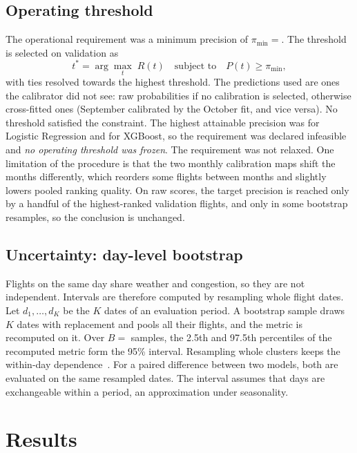 \documentclass[conference]{IEEEtran}
\begin{document}
\subsection{Operating threshold}
The operational requirement was a minimum precision of $\pi_{\min}=$\MinPrecision{}. The threshold
is selected on validation as
\begin{equation}
t^{*}=\arg\max_{t}\; R(t)\quad\text{subject to}\quad P(t)\geq \pi_{\min},
\end{equation}
with ties resolved towards the highest threshold. The predictions used are ones the calibrator did
not see: raw probabilities if no calibration is selected, otherwise cross-fitted ones (September
calibrated by the October fit, and vice versa). No threshold satisfied the constraint. The highest
attainable precision was \MaxPrecLR{} for Logistic Regression and \MaxPrecXGB{} for XGBoost, so
the requirement was declared infeasible and \emph{no operating threshold was frozen}. The
requirement was not relaxed. One limitation of the procedure is that the two monthly calibration
maps shift the months differently, which reorders some flights between months and slightly lowers
pooled ranking quality. On raw scores, the target precision is reached only by a handful of the
highest-ranked validation flights, and only in some bootstrap resamples, so the conclusion is
unchanged.

\subsection{Uncertainty: day-level bootstrap}
Flights on the same day share weather and congestion, so they are not independent. Intervals are
therefore computed by resampling whole flight dates. Let $d_1,\dots,d_K$ be the $K$ dates of an
evaluation period. A bootstrap sample draws $K$ dates with replacement and pools all their flights,
and the metric is recomputed on it. Over $B=$\TestBootResamples{} samples, the 2.5th and 97.5th
percentiles of the recomputed metric form the 95\% interval. Resampling whole clusters keeps the
within-day dependence~\cite{field2007}. For a paired difference between two models, both are
evaluated on the same resampled dates. The interval assumes that days are exchangeable within a
period, an approximation under seasonality.

\section{Results}\label{sec:results}
\end{document}
